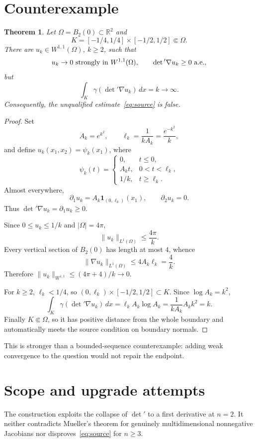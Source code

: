 \documentclass[11pt,a4paper]{article}
\newtheorem{theorem}{Theorem}
\newcommand{\R}{\mathbb R}
\begin{document}
\section{Counterexample}
\begin{theorem}\label{thm:main}
Let $\Omega=B_2(0)\subset\R^2$ and
\[
 K=[-1/4,1/4]\times[-1/2,1/2]\Subset\Omega.
\]
There are $u_k\in W^{1,1}(\Omega)$, $k\geq2$, such that
\[
 u_k\to0\ \hbox{strongly in }W^{1,1}(\Omega),\qquad
 \det{}'\nabla u_k\geq0\ \hbox{a.e.},
\]
but
\[
 \int_K\gamma(\det{}'\nabla u_k)\,dx=k\to\infty.
\]
Consequently, the unqualified estimate~\eqref{eq:source} is false.
\end{theorem}

\begin{proof}
Set
\[
 A_k=e^{k^2},\qquad \ell_k=\frac1{kA_k}=\frac{e^{-k^2}}k,
\]
and define $u_k(x_1,x_2)=\psi_k(x_1)$, where
\[
 \psi_k(t)=
 \begin{cases}
 0,&t\leq0,\\
 A_kt,&0<t<\ell_k,\\
 1/k,&t\geq\ell_k.
 \end{cases}
\]
Almost everywhere,
\[
 \partial_1u_k=A_k\mathbf1_{(0,\ell_k)}(x_1),\qquad
 \partial_2u_k=0.
\]
Thus $\det{}'\nabla u_k=\partial_1u_k\geq0$.

Since $0\leq u_k\leq1/k$ and $|\Omega|=4\pi$,
\[
 \|u_k\|_{L^1(\Omega)}\leq\frac{4\pi}{k}.
\]
Every vertical section of $B_2(0)$ has length at most $4$, whence
\[
 \|\nabla u_k\|_{L^1(\Omega)}
 \leq4A_k\ell_k=\frac4k.
\]
Therefore $\|u_k\|_{W^{1,1}}\leq(4\pi+4)/k\to0$.

For $k\geq2$, $\ell_k<1/4$, so
$(0,\ell_k)\times[-1/2,1/2]\subset K$.  Since $\log A_k=k^2$,
\[
 \int_K\gamma(\det{}'\nabla u_k)\,dx
 =\ell_kA_k\log A_k
 =\frac1{kA_k}A_kk^2=k.
\]
Finally $K\Subset\Omega$, so it has positive distance from the whole boundary
and automatically meets the source condition on boundary normals.
\end{proof}

This is stronger than a bounded-sequence counterexample: adding weak
convergence to the question would not repair the endpoint.

\section{Scope and upgrade attempts}
The construction exploits the collapse of $\det{}'$ to a first derivative at
$n=2$.  It neither contradicts Mueller's theorem for genuinely
multidimensional nonnegative Jacobians nor disproves~\eqref{eq:source} for
$n\geq3$.
\end{document}
